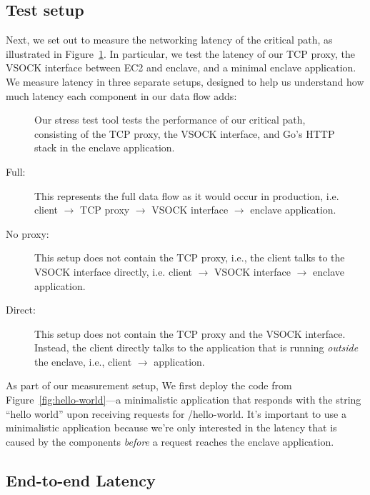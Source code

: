 \subsection{Test setup}
\label{sec:test-setup}

Next, we set out to measure the networking latency of the critical path, as
illustrated in Figure~\ref{fig:stress-test}.  In particular, we test the
latency of our TCP proxy, the VSOCK interface between EC2 and enclave, and a
minimal enclave application.
%
We measure latency in three separate setups, designed to help us understand how
much latency each component in our data flow adds:

\begin{figure}[t]
    \centering
    
    \caption{Our stress test tool tests the performance of our critical path,
    consisting of the TCP proxy, the VSOCK interface, and Go's HTTP stack in
    the enclave application.}
    \label{fig:stress-test}
\end{figure}

\begin{description}
  \item[Full:] This represents the full data flow as it would occur in
    production, i.e. client $\rightarrow$ TCP proxy $\rightarrow$ VSOCK
    interface $\rightarrow$ enclave application.

  \item[No proxy:] This setup does not contain the TCP proxy, i.e., the client
    talks to the VSOCK interface directly, i.e. client $\rightarrow$ VSOCK
    interface $\rightarrow$ enclave application.

  \item[Direct:] This setup does not contain the TCP proxy and the VSOCK
    interface.  Instead, the client directly talks to the application that is
    running \emph{outside} the enclave, i.e., client $\rightarrow$ application.
\end{description}

As part of our measurement setup, We first deploy the code from
Figure~\ref{fig:hello-world}---a minimalistic application that responds with
the string ``hello world'' upon receiving requests for /hello-world.  It's
important to use a minimalistic application because we're only interested in
the latency that is caused by the components \emph{before} a request reaches
the enclave application.

\subsection{End-to-end Latency}
\label{sec:end-to-end}

